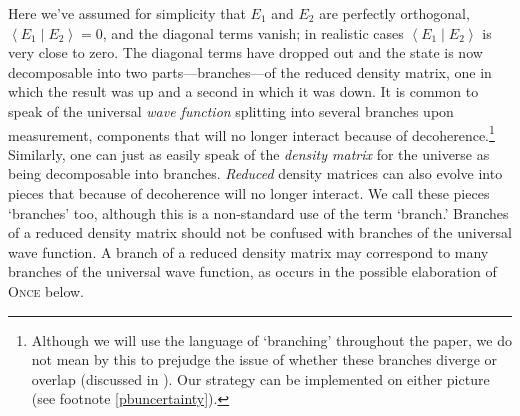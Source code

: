 \documentclass[12pt,onecolumn,secnumarabic,amsmath,amssymb,balancelastpage,nofootinbib]{article}
\newcommand{\bracket}[2]{\ensuremath{\left\langle #1 \middle| #2 \right\rangle}}
\begin{document}
Here we've assumed for simplicity that $E_1$ and $E_2$ are perfectly orthogonal, $\bracket{E_1}{E_2}=0$, and the diagonal terms vanish; in realistic cases $\bracket{E_1}{E_2}$ is very close to zero.  The diagonal terms have dropped out and the state is now decomposable into two parts---branches---of the reduced density matrix, one in which the result was up and a second in which it was down.  It is common to speak of the universal \emph{wave function} splitting into several branches upon measurement, components that will no longer interact because of decoherence.\footnote{Although we will use the language of `branching' throughout the paper, we do not mean by this to prejudge the issue of whether these branches diverge or overlap (discussed in \citealp{saunders2010b,wilson2012b}).  Our strategy can be implemented on either picture (see footnote \ref{pbuncertainty}).}  Similarly, one can just as easily speak of the \emph{density matrix} for the universe as being decomposable into branches.  \emph{Reduced} density matrices can also evolve into pieces that because of decoherence will no longer interact.  We call these pieces `branches' too, although this is a non-standard use of the term `branch.'  Branches of a reduced density matrix should not be confused with branches of the universal wave function.  A branch of a reduced density matrix may correspond to many branches of the universal wave function, as occurs in the possible elaboration of \textsc{Once} below.
\end{document}
